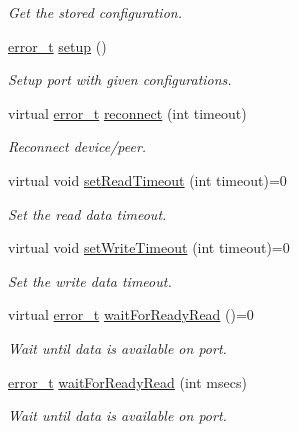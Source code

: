 \begin{DoxyCompactItemize}
\begin{DoxyCompactList}\small\item\em Get the stored configuration. \end{DoxyCompactList}\item 
\hyperlink{classmdt_abstract_port_ad4121bb930c95887e77f8bafa065a85e}{error\_\-t} \hyperlink{classmdt_abstract_port_abc9f1154ac71c4e31ac3e7a3ff4c5182}{setup} ()
\begin{DoxyCompactList}\small\item\em Setup port with given configurations. \end{DoxyCompactList}\item 
virtual \hyperlink{classmdt_abstract_port_ad4121bb930c95887e77f8bafa065a85e}{error\_\-t} \hyperlink{classmdt_abstract_port_aec74b2db1a629d98a95d8f042ea96653}{reconnect} (int timeout)
\begin{DoxyCompactList}\small\item\em Reconnect device/peer. \end{DoxyCompactList}\item 
virtual void \hyperlink{classmdt_abstract_port_a6589b04467e0073d18ba872201bdcd84}{setReadTimeout} (int timeout)=0
\begin{DoxyCompactList}\small\item\em Set the read data timeout. \end{DoxyCompactList}\item 
virtual void \hyperlink{classmdt_abstract_port_a12eb422d52ebb09a650f8497b258c2e7}{setWriteTimeout} (int timeout)=0
\begin{DoxyCompactList}\small\item\em Set the write data timeout. \end{DoxyCompactList}\item 
virtual \hyperlink{classmdt_abstract_port_ad4121bb930c95887e77f8bafa065a85e}{error\_\-t} \hyperlink{classmdt_abstract_port_aeda364cb191da1038a22dd1fc06a1d49}{waitForReadyRead} ()=0
\begin{DoxyCompactList}\small\item\em Wait until data is available on port. \end{DoxyCompactList}\item 
\hyperlink{classmdt_abstract_port_ad4121bb930c95887e77f8bafa065a85e}{error\_\-t} \hyperlink{classmdt_abstract_port_a47f4db2e72b5fd3e32162e6a898fd391}{waitForReadyRead} (int msecs)
\begin{DoxyCompactList}\small\item\em Wait until data is available on port. \end{DoxyCompactList}\item 

\end{DoxyCompactItemize}
